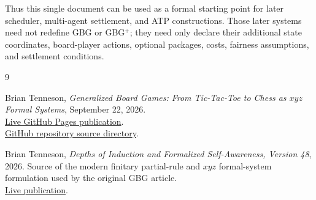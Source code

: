 \documentclass[11pt]{article}
\theoremstyle{definition}
\theoremstyle{remark}
\begin{document}
Thus this single document can be used as a formal starting point for later scheduler, multi-agent settlement, and ATP constructions.  Those later systems need not redefine GBG or GBG$^{+}$; they need only declare their additional state coordinates, board-player actions, optional packages, costs, fairness assumptions, and settlement conditions.

\begin{thebibliography}{9}

Brian Tenneson,
\emph{Generalized Board Games: From Tic-Tac-Toe to Chess as $xyz$ Formal Systems},
September 22, 2026.\\
\href{https://btenneson.github.io/pub/cs.LO_Logic_in_Computer_Science/generalized_board_games_tic_tac_toe_chess_001/}{Live GitHub Pages publication}.\\
\href{https://github.com/btenneson/pub/tree/main/docs/cs.LO_Logic_in_Computer_Science/generalized_board_games_tic_tac_toe_chess_001}{GitHub repository source directory}.

Brian Tenneson,
\emph{Depths of Induction and Formalized Self-Awareness, Version 48},
2026.  Source of the modern finitary partial-rule and $xyz$ formal-system formulation used by the original GBG article.\\
\href{https://btenneson.github.io/pub/cs.LO_Logic_in_Computer_Science/depths_of_induction_v48/}{Live publication}.

\end{thebibliography}
\end{document}
